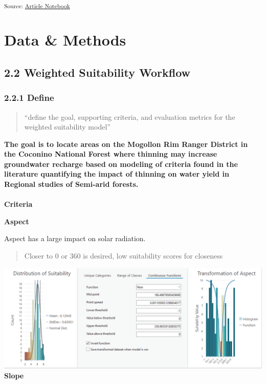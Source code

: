 \documentclass[
]{agujournal2019}
\makeatletter
\let\oldparagraph\paragraph
\renewcommand{\paragraph}{
    \@ifstar
      \xxxParagraphStar
      \xxxParagraphNoStar
  }
\newcommand{\xxxParagraphStar}[1]{\oldparagraph*{#1}\mbox{}}
\newcommand{\xxxParagraphNoStar}[1]{\oldparagraph{#1}\mbox{}}
\makeatother
\begin{document}
\textsubscript{Source:
\href{https://Ryan3Lima.github.io/ATUR-ForestThinning/index.ipynb.html}{Article
Notebook}}

\section{Data \& Methods}\label{sec-data-methods}

\subsection{2.2 Weighted Suitability
Workflow}\label{weighted-suitability-workflow}

\subsubsection{2.2.1 Define}\label{define}

\begin{quote}
``define the goal, supporting criteria, and evaluation metrics for the
weighted suitability model''
\end{quote}

\textbf{The goal is to locate areas on the Mogollon Rim Ranger District
in the Coconino National Forest where thinning may increase groundwater
recharge based on modeling of criteria found in the literature
quantifying the impact of thinning on water yield in Regional studies of
Semi-arid forests.}

\paragraph{\texorpdfstring{\textbf{Criteria}}{Criteria}}\label{criteria}

\textbf{Aspect}

Aspect has a large impact on solar radiation.

\begin{quote}
Closer to 0 or 360 is desired, low suitability scores for closeness
\end{quote}

\includegraphics{images/Aspect_suitability.PNG} \textbf{Slope}
\end{document}
